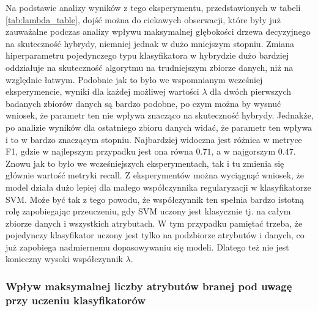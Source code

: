 \documentclass[
    left=2.5cm,         %
    right=2.5cm,        %
    top=2.5cm,          %
    bottom=3cm,         %
    bindingoffset=6mm,  %
    nohyphenation=false %
]{eiti/eiti-report}
\begin{document}
Na podstawie analizy wyników z tego eksperymentu, przedstawionych w tabeli \ref{tab:lambda_table}, dojść można do ciekawych obserwacji, które były już zauważalne podczas analizy wpływu maksymalnej głębokości drzewa decyzyjnego na skuteczność hybrydy, niemniej jednak w dużo mniejszym stopniu. Zmiana hiperparametru pojedynczego typu klasyfikatora w hybrydzie dużo bardziej oddziałuje na skuteczność algorytmu na trudniejszym zbiorze danych, niż na względnie łatwym. Podobnie jak to było we wspomnianym wcześniej eksperymencie, wyniki dla każdej możliwej wartości $\lambda$ dla dwóch pierwszych badanych zbiorów danych są bardzo podobne, po czym można by wysnuć wniosek, że parametr ten nie wpływa znacząco na skuteczność hybrydy. Jednakże, po analizie wyników dla ostatniego zbioru danych widać, że parametr ten wpływa i to w bardzo znaczącym stopniu. Najbardziej widoczna jest różnica w metryce F1, gdzie w najlepszym przypadku jest ona równa $0.71$, a w najgorszym $0.47$. Znowu jak to było we wcześniejszych eksperymentach, tak i tu zmienia się głównie wartość metryki recall. Z eksperymentów można wyciągnąć wniosek, że model działa dużo lepiej dla małego współczynnika regularyzacji w klasyfikatorze SVM. Może być tak z tego powodu, że współczynnik ten spełnia bardzo istotną rolę zapobiegając przeuczeniu, gdy SVM uczony jest klasycznie tj. na całym zbiorze danych i wszystkich atrybutach. W tym przypadku pamiętać trzeba, że pojedynczy klasyfikator uczony jest tylko na podzbiorze atrybutów i danych, co już zapobiega nadmiernemu dopasowywaniu się modeli. Dlatego też nie jest konieczny wysoki współczynnik $\lambda$.

\subsubsection{Wpływ maksymalnej liczby atrybutów branej pod uwagę przy uczeniu klasyfikatorów}
\end{document}
